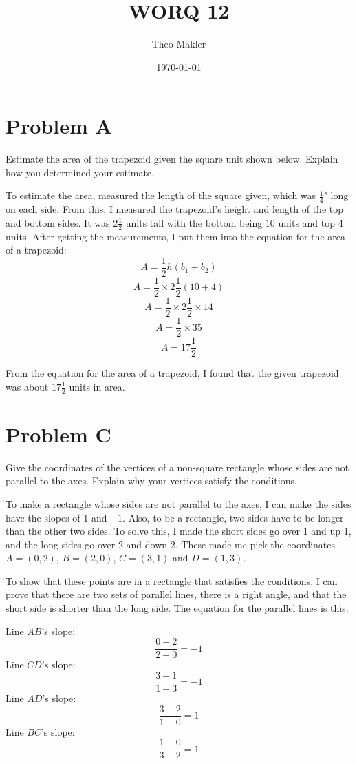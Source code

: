 \documentclass[a4paper]{article}
\title{WORQ 12}
\author{Theo Makler}
\date{\today}
\begin{document}
\maketitle

\section{Problem A}

Estimate the area of the trapezoid given the square unit shown below. Explain how you determined your estimate.

To estimate the area,  measured the length of the square given, which was $\frac{1}{4}$" long on each side. From this, I measured the trapezoid's height and length of the top and bottom sides. It was $2\frac{1}{2}$ units tall with the bottom being $10$ units and top $4$ units. After getting the measurements, I put them into the equation for the area of a trapezoid:
$$A=\frac{1}{2}h(b_{1}+b_{2})$$
$$A=\frac{1}{2}\times2\frac{1}{2}(10+4)$$
$$A=\frac{1}{2}\times2\frac{1}{2}\times14$$
$$A=\frac{1}{2}\times35$$
$$A=17\frac{1}{2}$$

From the equation for the area of a trapezoid, I found that the given trapezoid was about $17\frac{1}{2}$ units in area.

\section{Problem C}

Give the coordinates of the vertices of a non-square rectangle whose sides are not parallel to the axes. Explain why your vertices satisfy the conditions.

To make a rectangle whose sides are not parallel to the axes, I can make the sides have the slopes of 1 and $-1$. Also, to be a rectangle, two sides have to be longer than the other two sides. To solve this, I made the short sides go over 1 and up 1, and the long sides go over 2 and down 2. These made me pick the coordinates $A=(0,2)$, $B=(2,0)$, $C=(3,1)$ and $D=(1,3)$.

To show that these points are in a rectangle that satisfies the conditions, I can prove that there are two sets of parallel lines, there is a right angle, and that the short side is shorter than the long side. The equation for the parallel lines is this:

Line $AB$'s slope:
$$\frac{0-2}{2-0}=-1$$
Line $CD$'s slope:
$$\frac{3-1}{1-3}=-1$$
Line $AD$'s slope:
$$\frac{3-2}{1-0}=1$$
Line $BC$'s slope:
$$\frac{1-0}{3-2}=1$$
\end{document}
